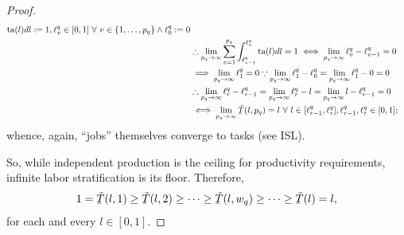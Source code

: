\documentclass[hidelinks, nonatbib]{elsarticle}
\begin{document}
\begin{lemma}
\begin{proof}
\begin{align}
            \ta(l)dl
            :=
            1,
            \ell_{v}^{q} \in [0,1]
            \
            \forall
            \
            v \in \{1, \dots, p_q\}
            \land
            \ell_{0}^{q}
            := 0
            \\
            &
            \therefore
            \lim_{p_q \rightarrow \infty}{
                \sum_{v=1}^{p_q}
                \int_{\ell_{v-1}^{q}}^{\ell_{v}^{q}}
                \ta(l)dl
            } 
            =
            1
            \iff
            \lim_{p_q \rightarrow \infty}{
                \ell_{v}^{q} - \ell_{v-1}^{q}
            }
            =
            0
            \\
            &
            \implies
            \lim_{p_q \rightarrow \infty}
            \ell_{1}^{q}
            = 0
            \because
            \lim_{p_q \rightarrow \infty}
            \ell_{1}^{q} - 
            \ell_{0}^{q}
            =
            \lim_{p_q \rightarrow \infty}
            \ell_{1}^{q} - 
            0
            = 0
            \\
            &
            \therefore
            \lim_{p_q \rightarrow \infty}{
                \ell_{r}^{q} - \ell_{r-1}^{q}
            }
            =
            \lim_{p_q \rightarrow \infty}{
                \ell_{r}^{q} - l
            }
            =
            \lim_{p_q \rightarrow \infty}{
                l - \ell_{r-1}^{q}
            }
            =
            0
            \\
            &
            \iff
            \lim_{p_q \rightarrow \infty}{
                \underaccent{\bar}{\tilde{T}}(l, p_q)
            }
            =
            l
            \
            \forall
            \
            l \in
            [\ell_{r-1}^{q}, \ell_{r}^{q}],
            \ell_{r-1}^{q}, \ell_{r}^{q}
            \in [0,1]
            ;
        \end{align}
        whence, again, ``jobs'' themselves converge to tasks (see ISL).

        So, while independent production is the ceiling for productivity requirements, infinite labor stratification is its floor. Therefore,
        \begin{gather}
            1
            =
            \underaccent{\bar}{\tilde{T}}(l, 1)
            \geq
            \underaccent{\bar}{\tilde{T}}(l, 2)
            \geq
            \dots
            \geq
            \underaccent{\bar}{\tilde{T}}(l, w_q)
            \geq
            \dots
            \geq
            \underaccent{\bar}{\tilde{T}}(l)
            =
            l
            ,
        \end{gather}
        for each and every $l \in [0,1]$. 


\end{proof}
\end{lemma}
\end{document}
